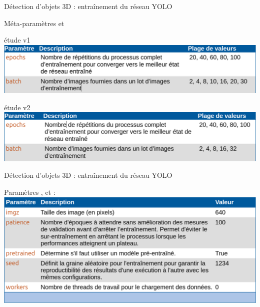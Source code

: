 \documentclass[11pt,serif,mathserif,compress,hyperref={colorlinks}]{beamer}
\begin{document}
\begin{frame}{Détection d'objets 3D : entraînement du réseau YOLO}
  
  \begin{tcolorbox}[title={Choix des méta-paramètres d’entraînement}]
    Méta-paramètres  et 

    {\tiny étude v1}\\[1mm]
      \includegraphics[width=\textwidth]{images/ChoixMetaParamV1.png}

    {\tiny étude v2}\\[1mm]
      \includegraphics[width=\textwidth]{images/ChoixMetaParamV2.png}

  \end{tcolorbox}
    
\end{frame}

\begin{frame}{Détection d'objets 3D : entraînement du réseau YOLO}
  
  \begin{tcolorbox}[title={Choix des paramètres d’entraînement}]
    Paramètres ,  et :\\[5mm]
   \includegraphics[width=\textwidth]{images/ChoixParam.png}
  \end{tcolorbox}
    
\end{frame}
\end{document}
